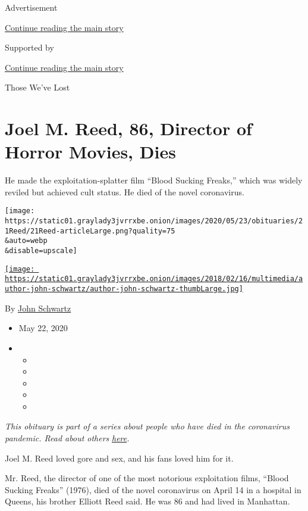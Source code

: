 Advertisement

\protect\hyperlink{after-top}{Continue reading the main story}

Supported by

\protect\hyperlink{after-sponsor}{Continue reading the main story}

Those We've Lost

\hypertarget{joel-m-reed-86-director-of-horror-movies-dies}{%
\section{Joel M. Reed, 86, Director of Horror Movies,
Dies}\label{joel-m-reed-86-director-of-horror-movies-dies}}

He made the exploitation-splatter film ``Blood Sucking Freaks,'' which
was widely reviled but achieved cult status. He died of the novel
coronavirus.

\texttt{[image: https://static01.graylady3jvrrxbe.onion/images/2020/05/23/obituaries/21Reed/21Reed-articleLarge.png?quality=75\\\&auto=webp\\\&disable=upscale]}

\href{https://www.nytimes3xbfgragh.onion/by/john-schwartz}{\texttt{[image: https://static01.graylady3jvrrxbe.onion/images/2018/02/16/multimedia/author-john-schwartz/author-john-schwartz-thumbLarge.jpg]}}

By \href{https://www.nytimes3xbfgragh.onion/by/john-schwartz}{John
Schwartz}

\begin{itemize}
\item
  May 22, 2020
\item
  \begin{itemize}
  \item
  \item
  \item
  \item
  \item
  \end{itemize}
\end{itemize}

\emph{This obituary is part of a series about people who have died in
the coronavirus pandemic. Read about others}
\href{https://www.nytimes3xbfgragh.onion/series/people-who-have-died-of-the-coronavirus}{\emph{here}}\emph{.}

Joel M. Reed loved gore and sex, and his fans loved him for it.

Mr. Reed, the director of one of the most notorious exploitation films,
``Blood Sucking Freaks'' (1976), died of the novel coronavirus on April
14 in a hospital in Queens, his brother Elliott Reed said. He was 86 and
had lived in Manhattan.

